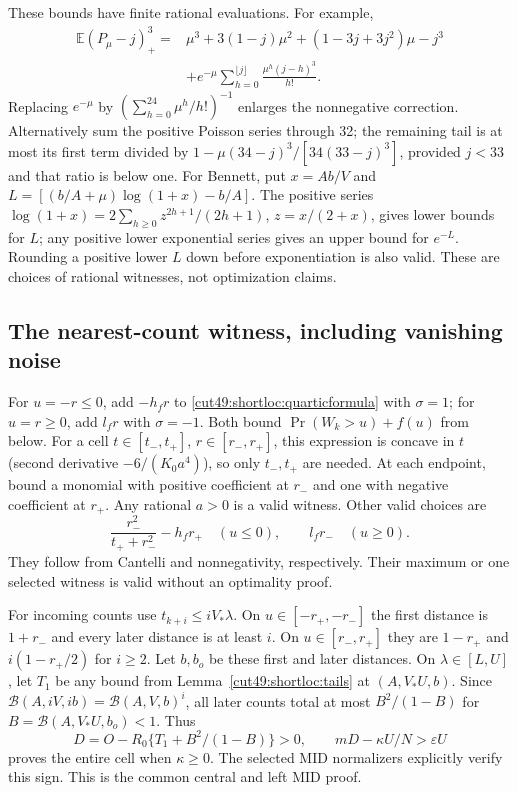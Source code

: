 \documentclass[11pt,a4paper]{article}
\numberwithin{equation}{section}
\theoremstyle{definition}
\theoremstyle{remark}
\begin{document}
These bounds have finite rational evaluations. For example,
\begin{align}\label{cut49:shortloc:poissonfinite}
 \mathbb E(P_\mu-j)_+^3={}&\mu^3+3(1-j)\mu^2+(1-3j+3j^2)\mu-j^3\\
 &+e^{-\mu}\sum_{h=0}^{\lfloor j\rfloor}\frac{\mu^h(j-h)^3}{h!}.\nonumber
\end{align}
Replacing $e^{-\mu}$ by $(\sum_{h=0}^{24}\mu^h/h!)^{-1}$ enlarges the
nonnegative correction. Alternatively sum the positive Poisson series
through 32; the remaining tail is at most its first term divided by
$1-\mu(34-j)^3/[34(33-j)^3]$, provided $j<33$ and that ratio is below one.
For Bennett, put $x=Ab/V$ and
$L=[(b/A+\mu)\log(1+x)-b/A]$. The positive series
$\log(1+x)=2\sum_{h\ge0}z^{2h+1}/(2h+1)$, $z=x/(2+x)$, gives lower
bounds for $L$; any positive lower exponential series gives an upper bound
for $e^{-L}$. Rounding a positive lower $L$ down before exponentiation is
also valid. These are choices of rational witnesses, not optimization claims.

\subsection{The nearest-count witness, including vanishing noise}

For $u=-r\le0$, add $-h_fr$ to \eqref{cut49:shortloc:quarticformula} with
$\sigma=1$; for $u=r\ge0$, add $l_fr$ with $\sigma=-1$.
Both bound $\Pr(W_k>u)+f(u)$ from below. For a cell
$t\in[t_-,t_+]$, $r\in[r_-,r_+]$, this expression is concave in $t$
(second derivative $-6/(K_0a^4)$), so only $t_-,t_+$ are needed.
At each endpoint, bound a monomial with positive coefficient at $r_-$
and one with negative coefficient at $r_+$. Any rational $a>0$ is a valid
witness. Other valid choices are
\begin{equation}\label{cut49:shortloc:ownother}
 \frac{r_-^2}{t_++r_-^2}-h_fr_+\quad(u\le0),\qquad l_fr_-\quad(u\ge0).
\end{equation}
They follow from Cantelli and nonnegativity, respectively. Their maximum
or one selected witness is valid without an optimality proof.

For incoming counts use $t_{k+i}\le iV_*\lambda$. On $u\in[-r_+,-r_-]$
the first distance is $1+r_-$ and every later distance is at least $i$.
On $u\in[r_-,r_+]$ they are $1-r_+$ and $i(1-r_+/2)$ for $i\ge2$.
Let $b,b_o$ be these first and later distances. On $\lambda\in[L,U]$,
let $T_1$ be any bound from Lemma~\ref{cut49:shortloc:tails} at $(A,V_*U,b)$.
Since $\mathcal B(A,iV,ib)=\mathcal B(A,V,b)^i$, all later counts total at most
$B^2/(1-B)$ for $B=\mathcal B(A,V_*U,b_o)<1$. Thus
\begin{equation}\label{cut49:shortloc:midtest}
 D=O-R_0\{T_1+B^2/(1-B)\}>0,\qquad
 mD-\kappa U/N>\varepsilon U
\end{equation}
proves the entire cell when $\kappa\ge0$. The selected MID normalizers
explicitly verify this sign. This is the common central and left MID proof.
\end{document}
